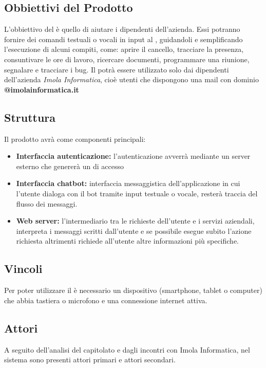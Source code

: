 \subsection{Obbiettivi del Prodotto}
L'obbiettivo del  è quello di aiutare i dipendenti dell'azienda. Essi potranno fornire dei comandi testuali o vocali in input al  , guidandoli e semplificando l'esecuzione di alcuni compiti, come: aprire il cancello, tracciare la presenza, 
consuntivare le ore di lavoro, ricercare documenti, programmare una riunione, segnalare e 
tracciare i bug. \newline
Il  potrà essere utilizzato solo dai dipendenti dell'azienda \textit{Imola Informatica}, cioè utenti che dispongono una
mail con dominio \textbf{@imolainformatica.it}

\subsection{Struttura}
Il prodotto avrà come componenti principali:
\begin{itemize}
    \item \textbf{Interfaccia autenticazione:} l'autenticazione avverrà mediante un server esterno che 
                genererà un  di accesso
    \item \textbf{Interfaccia chatbot:} interfaccia messaggistica dell'applicazione in cui l'utente dialoga 
                con il bot tramite input testuale o vocale, resterà traccia del flusso dei messaggi.
    \item \textbf{Web server:} l'intermediario tra le richieste dell'utente e i servizi aziendali, interpreta 
                i messaggi scritti dall'utente e se possibile esegue subito l'azione richiesta altrimenti 
                richiede all'utente altre informazioni più specifiche.
\end{itemize}

\subsection{Vincoli}
Per poter utilizzare il  è necessario un dispositivo (smartphone, tablet o computer) che 
abbia tastiera o microfono e una connessione internet attiva.

\subsection{Attori}
A seguito dell'analisi del capitolato e dagli incontri con Imola Informatica, nel sistema sono presenti attori primari e attori secondari.
